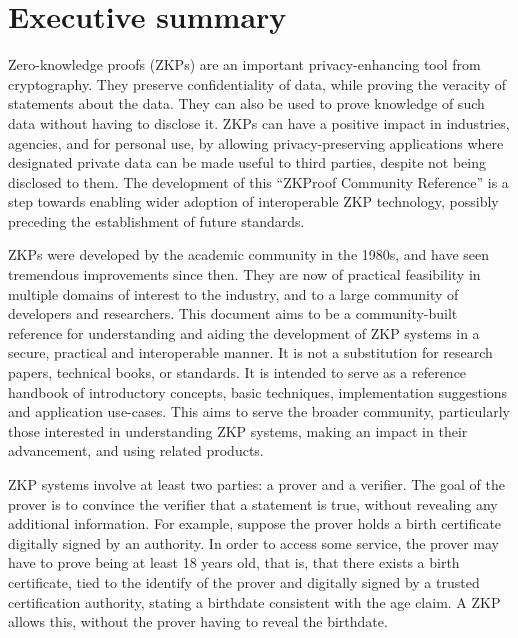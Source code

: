 \section*{Executive summary}

Zero-knowledge proofs (ZKPs) are an important privacy-enhancing tool from cryptography. 
They preserve confidentiality of data, while proving the veracity of statements about the data. %
They can also be used to prove knowledge of such data without having to disclose it. %
    ZKPs can have a positive impact in industries, agencies, and for personal use, 
by allowing privacy-preserving applications where designated private data
can be made useful to third parties, despite not being disclosed to them.
	The development of this ``ZKProof Community Reference'' is a step towards enabling wider 
adoption of interoperable ZKP technology, possibly preceding the establishment of future standards.


    ZKPs were developed by the academic community in the 1980s, and have seen tremendous improvements since then.
	They are now of practical feasibility in multiple domains of interest to the industry, and to a large community of developers and researchers.  
	This document aims to be a community-built reference for understanding and aiding the development of ZKP systems in a secure, practical and interoperable manner.
	It is not a substitution for research papers, technical books, or standards. It is intended to 
serve as a reference handbook of introductory concepts, basic techniques, implementation suggestions and application use-cases. 
	This aims to serve the broader community, particularly those interested in understanding ZKP systems, making an impact in their advancement, and using related products.


	ZKP systems involve at least two parties: a prover and a verifier.  
	The goal of the prover is to convince the verifier that a statement is true, without revealing any additional information.  
	For example, suppose the prover holds a birth certificate digitally signed by an authority.
	In order to access some service, the prover may have to prove being at least 18 years old, that is, that there exists a birth certificate, tied to the identify of the prover and digitally signed by a trusted certification authority, stating a birthdate consistent with the age claim.
	A ZKP allows this, without the prover having to reveal the birthdate.


